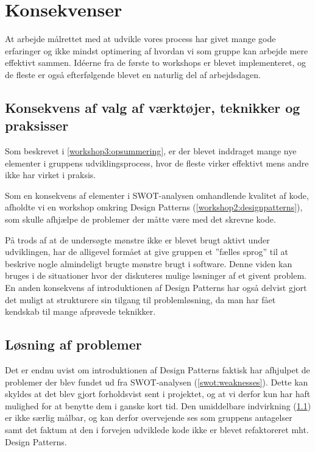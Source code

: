 \section{Konsekvenser}\label{konsekvenser}
At arbejde målrettet med at udvikle vores process har givet mange gode erfaringer og ikke mindst optimering af hvordan vi som gruppe kan arbejde mere effektivt sammen.
Idéerne fra de første to workshops er blevet implementeret, og de fleste er også efterfølgende blevet en naturlig del af arbejdsdagen.

\subsection{Konsekvens af valg af værktøjer, teknikker og praksisser}\label{konsekvens:valg}
Som beskrevet i \cref{workshop3:opsummering}, er der blevet inddraget mange nye elementer i gruppens udviklingsprocess, hvor de fleste virker effektivt mens andre ikke har virket i praksis.

Som en konsekvens af elementer i SWOT-analysen omhandlende kvalitet af kode, afholdte vi en workshop omkring Design Patterns (\cref{workshop2:designpatterns}), som skulle afhjælpe de problemer der måtte være med det skrevne kode.

På trods af at de undersøgte mønstre ikke er blevet brugt aktivt under udviklingen, har de alligevel formået at give gruppen et ''fælles sprog'' til at beskrive nogle almindeligt brugte mønstre brugt i software.
Denne viden kan bruges i de situationer hvor der diskuteres mulige løsninger af et givent problem.
En anden konsekvens af introduktionen af Design Patterns har også delvist gjort det muligt at strukturere sin tilgang til problemløsning, da man har fået kendskab til mange afprøvede teknikker.

\subsection{Løsning af problemer}\label{konsekvens:problemer}
Det er endnu uvist om introduktionen af Design Patterns faktisk har afhjulpet de problemer der blev fundet ud fra SWOT-analysen (\cref{swot:weaknesses}).
Dette kan skyldes at det blev gjort forholdsvist sent i projektet, og at vi derfor kun har haft mulighed for at benytte dem i ganske kort tid.
Den umiddelbare indvirkning (\cref{konsekvens:valg}) er ikke særlig målbar, og kan derfor overvejende ses som gruppens antagelser samt det faktum at den i forvejen udviklede kode ikke er blevet refaktoreret mht. Design Patterns.

